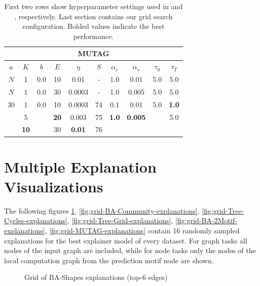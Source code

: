 \begin{table}[h]
  \centering
  \scriptsize
  \begin{tabular}{|c|c|c|c|c|c|c|c|c|c|}
  \hline
  \multicolumn{10}{|c|}{\textbf{MUTAG}} \\ \hline
  $a$ & $K$ & $b$ & $E$ & $\eta$ & $S$ & $\alpha_e$ & $\alpha_s$ & $\tau_0$ & $\tau_T$ \\ \hline
  $N$ & 1 & 0.0 & 10 & 0.01 & - & 1.0 & 0.01 & 5.0 & 5.0 \\ \hline
  $N$ & 1 & 0.0 & 30 & 0.0003 & - & 1.0 & 0.005 & 5.0 & 5.0 \\ \midrule
  30 & 1 & 0.0 & 10 & 0.0003 & 74 & 0.1 & 0.01 & 5.0 & \textbf{1.0} \\
   & 5 &  & \textbf{20} & 0.003 & 75 & \textbf{1.0} & \textbf{0.005} &  & 5.0 \\
   & \textbf{10} &  & 30 & \textbf{0.01} & 76 &  &  &  &  \\ \hline
  \end{tabular}
  \caption[MUTAG Grid Search]{First two rows show hyperparameter settings used in \cite{luo2020parameterized} and \cite{holdijk2021re}, respectively. Last section contains our grid search configuration. Bolded values indicate the best performance.}
\end{table}

\clearpage
\section{Multiple Explanation Visualizations}
\label{sec:grid_vis}
The following figures \ref{fig:grid-BA-Shapes-explanations}, \ref{fig:grid-BA-Community-explanations}, \ref{fig:grid-Tree-Cycles-explanations}, \ref{fig:grid-Tree-Grid-explanations}, \ref{fig:grid-BA-2Motif-explanations}, \ref{fig:grid-MUTAG-explanations} contain 16 randomly sampled explanations for the best explainer model of every dataset. For graph tasks all nodes of the input graph are included, while for node tasks only the nodes of the local computation graph from the prediction motif node are shown.

\begin{figure}[htbp]
    \centering
    \caption{Grid of BA-Shapes explanations (top-6 edges)}
    \label{fig:grid-BA-Shapes-explanations}
\end{figure}

